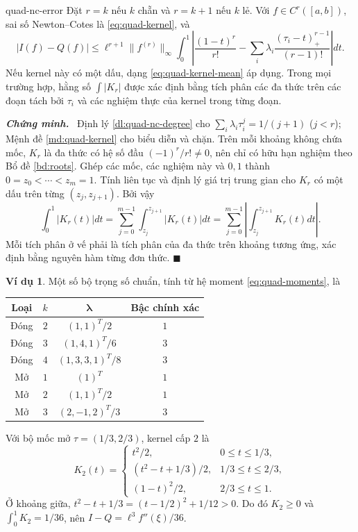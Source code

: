 \documentclass[12pt,a4paper,oneside]{book}
\numberwithin{algorithm}{chapter}
\theoremstyle{definition}
\newtheorem{vidu}{Ví dụ}[chapter]
\newenvironment{chungminh}{\par\medskip\noindent\textbf{\textit{\color{mainblue}Chứng minh.}}\ }{\hfill$\blacksquare$\par\medskip}
\begin{document}
\begin{hequa}{}{quad-nc-error}
Đặt $r=k$ nếu $k$ chẵn và $r=k+1$ nếu $k$ lẻ. Với $f\in C^r([a,b])$, sai số Newton--Cotes là \eqref{eq:quad-kernel}, và
\[
 |I(f)-Q(f)|\leq\ell^{r+1}\lVert f^{(r)}\rVert_\infty
 \int_0^1\left|\frac{(1-t)^r}{r!}
 -\sum_i\lambda_i\frac{(\tau_i-t)_+^{r-1}}{(r-1)!}\right|dt.
\]
Nếu kernel này có một dấu, dạng \eqref{eq:quad-kernel-mean} áp dụng. Trong mọi trường hợp, hằng số $\int|K_r|$ được xác định bằng tích phân các đa thức trên các đoạn tách bởi $\tau_i$ và các nghiệm thực của kernel trong từng đoạn.
\end{hequa}
\begin{chungminh}
Định lý \ref{dl:quad-nc-degree} cho $\sum_i\lambda_i\tau_i^j=1/(j+1)$ ($j<r$); Mệnh đề \ref{md:quad-kernel} cho biểu diễn và chặn. Trên mỗi khoảng không chứa mốc, $K_r$ là đa thức có hệ số đầu $(-1)^r/r!\ne0$, nên chỉ có hữu hạn nghiệm theo Bổ đề \ref{bd:roots}. Ghép các mốc, các nghiệm này và $0,1$ thành $0=z_0<\cdots<z_m=1$. Tính liên tục và định lý giá trị trung gian cho $K_r$ có một dấu trên từng $(z_j,z_{j+1})$. Bởi vậy
\[
 \int_0^1|K_r(t)|dt
 =\sum_{j=0}^{m-1}\int_{z_j}^{z_{j+1}}|K_r(t)|dt
 =\sum_{j=0}^{m-1}\left|\int_{z_j}^{z_{j+1}}K_r(t)dt\right|.
\]
Mỗi tích phân ở vế phải là tích phân của đa thức trên khoảng tương ứng, xác định bằng nguyên hàm từng đơn thức.
\end{chungminh}

\begin{vidu}
Một số bộ trọng số chuẩn, tính từ hệ moment \eqref{eq:quad-moments}, là
\begin{center}
\begin{tabular}{c|c|c|c}
\toprule
Loại & $k$ & $\boldsymbol\lambda$ & Bậc chính xác\\
\midrule
Đóng & $2$ & $(1,1)^T/2$ & $1$\\
Đóng & $3$ & $(1,4,1)^T/6$ & $3$\\
Đóng & $4$ & $(1,3,3,1)^T/8$ & $3$\\
Mở & $1$ & $(1)^T$ & $1$\\
Mở & $2$ & $(1,1)^T/2$ & $1$\\
Mở & $3$ & $(2,-1,2)^T/3$ & $3$\\
\bottomrule
\end{tabular}
\end{center}
Với bộ mốc mở $\tau=(1/3,2/3)$, kernel cấp $2$ là
\[
 K_2(t)=\begin{cases}t^2/2,&0\leq t\leq1/3,\\
 (t^2-t+1/3)/2,&1/3\leq t\leq2/3,\\
 (1-t)^2/2,&2/3\leq t\leq1.
 \end{cases}
\]
Ở khoảng giữa, $t^2-t+1/3=(t-1/2)^2+1/12>0$. Do đó $K_2\geq0$ và $\int_0^1K_2=1/36$, nên $I-Q=\ell^3 f''(\xi)/36$.
\end{vidu}
\end{document}
